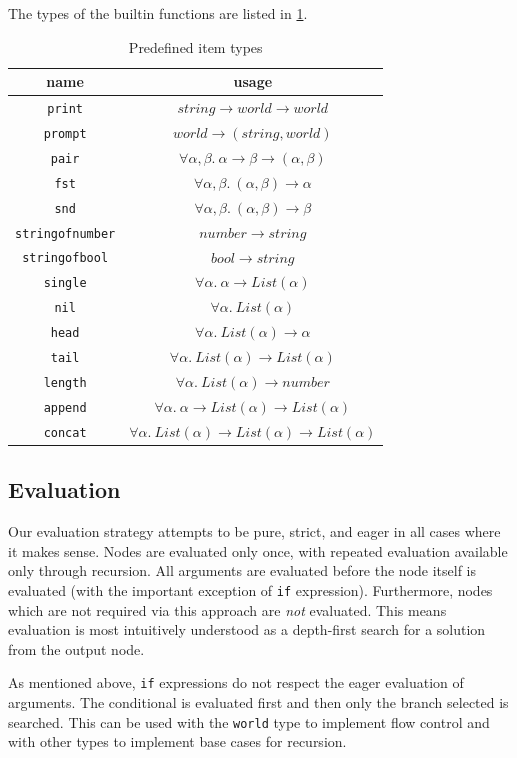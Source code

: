 \documentclass[12pt,UTF8,a4]{article}
\newcommand{\code}[1]{\texttt{#1}}
\newcommand{\type}[1]{\texttt{#1}}
\begin{document}
The types of the builtin functions are listed in \ref{tab:pitemts}.
\begin{table}[h!]
\center
\begin{tabular}{c|c}
\hline
name & usage \\
\hline
\code{print} & $string \rightarrow world \rightarrow world$\\
\code{prompt} & $world \rightarrow (string, world)$\\
\code{pair} & $\forall \alpha,\beta.\ \alpha \rightarrow \beta \rightarrow (\alpha, \beta)$\\
\code{fst} & $\forall \alpha,\beta.\ (\alpha, \beta) \rightarrow \alpha$ \\
\code{snd} & $\forall \alpha,\beta.\ (\alpha, \beta) \rightarrow \beta$ \\
\code{stringofnumber} & $number \rightarrow string$\\
\code{stringofbool} & $bool \rightarrow string$\\
\code{single} & $\forall \alpha.\ \alpha \rightarrow List(\alpha)$ \\
\code{nil} & $\forall \alpha.\ List(\alpha)$ \\
\code{head} & $\forall \alpha.\ List(\alpha) \rightarrow \alpha$ \\
\code{tail} & $\forall \alpha.\ List(\alpha) \rightarrow List(\alpha)$ \\
\code{length} & $\forall \alpha.\ List(\alpha) \rightarrow number$ \\
\code{append} & $\forall \alpha.\ \alpha \rightarrow List(\alpha) \rightarrow List(\alpha)$ \\
\code{concat} & $\forall \alpha.\ List(\alpha) \rightarrow List(\alpha) \rightarrow List(\alpha)$
\end{tabular}
\caption{Predefined item types}\label{tab:pitemts}
\end{table}

\subsection{Evaluation}
Our evaluation strategy attempts to be pure, strict, and eager in all
cases where it makes sense. Nodes are evaluated only once, with
repeated evaluation available only through recursion. All arguments
are evaluated before the node itself is evaluated (with the important
exception of \code{if} expression). Furthermore, nodes which are not
required via this approach are {\em not} evaluated. This means
evaluation is most intuitively understood as a depth-first search for
a solution from the output node.

As mentioned above, \code{if} expressions do not respect the eager
evaluation of arguments. The conditional is evaluated first and then
only the branch selected is searched. This can be used with the
\type{world} type to implement flow control and with other types to
implement base cases for recursion.
\end{document}
